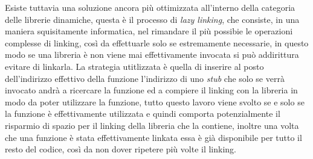 \documentclass[class=book, crop=false, oneside]{standalone}
\begin{document}
Esiste tuttavia una soluzione ancora più ottimizzata all'interno della categoria delle librerie dinamiche, questa è il processo di \emph{lazy linking}, che consiste, in una maniera squisitamente informatica, nel rimandare il più possibie le operazioni complesse di linking, così da effettuarle solo se estremamente necessarie, in questo modo se una libreria è non viene mai effettivamente invocata si può addirittura evitare di linkarla.
La strategia utitlizzata è quella di inserire al posto dell'indirizzo effettivo della funzione l'indirizzo di uno \emph{stub} che solo se verrà invocato andrà a ricercare la funzione ed a compiere il linking con la libreria in modo da poter utilizzare la funzione, tutto questo lavoro viene svolto se e solo se la funzione è effettivamente utilizzata e quindi comporta potenzialmente il risparmio di spazio per il linking della libreria che la contiene, inoltre una volta che una funzione è stata effettivamente linkata essa è già disponibile per tutto il resto del codice, così da non dover ripetere più volte il linking.

\end{document}
